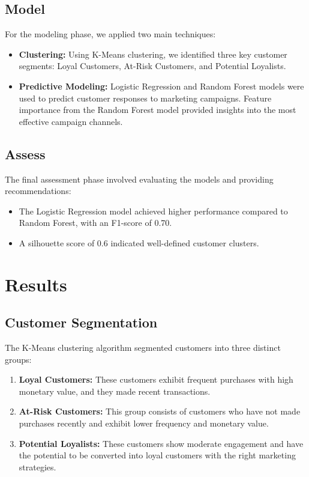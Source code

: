 \documentclass[12pt]{article}
\begin{document}
\subsection{Model}
For the modeling phase, we applied two main techniques:
\begin{itemize}
    \item \textbf{Clustering:} Using K-Means clustering, we identified three key customer segments: Loyal Customers, At-Risk Customers, and Potential Loyalists.
    \item \textbf{Predictive Modeling:} Logistic Regression and Random Forest models were used to predict customer responses to marketing campaigns. Feature importance from the Random Forest model provided insights into the most effective campaign channels.
\end{itemize}

\subsection{Assess}
The final assessment phase involved evaluating the models and providing recommendations:
\begin{itemize}
    \item The Logistic Regression model achieved higher performance compared to Random Forest, with an F1-score of 0.70.
    \item A silhouette score of 0.6 indicated well-defined customer clusters.
\end{itemize}

\section{Results}

\subsection{Customer Segmentation}
The K-Means clustering algorithm segmented customers into three distinct groups:
\begin{enumerate}
    \item \textbf{Loyal Customers:} These customers exhibit frequent purchases with high monetary value, and they made recent transactions.
    \item \textbf{At-Risk Customers:} This group consists of customers who have not made purchases recently and exhibit lower frequency and monetary value.
    \item \textbf{Potential Loyalists:} These customers show moderate engagement and have the potential to be converted into loyal customers with the right marketing strategies.
\end{enumerate}
\end{document}
